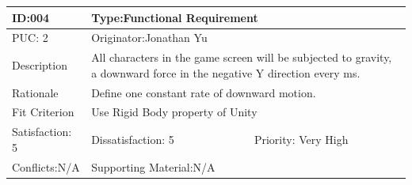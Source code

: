 \documentclass{article}
\begin{document}
	\begin{table}[H]
		\begin{tabular}{|l|l|l|}
			\hline
			ID:004 & \multicolumn{2}{l|}{Type:Functional Requirement} \\ \hline
			PUC: 2& \multicolumn{2}{l|}{Originator:Jonathan Yu} \\ \hline
			Description & \multicolumn{2}{m{0.85\textwidth}|}{All characters in the game screen will be subjected to gravity, a downward force in the negative Y direction every ms.} \\ \hline
			Rationale & \multicolumn{2}{m{0.85\textwidth}|}{Define one constant rate of downward motion.} \\ \hline
			Fit Criterion & \multicolumn{2}{m{0.85\textwidth}|}{Use Rigid Body property of Unity} \\ \hline
			Satisfaction: 5 & Dissatisfaction: 5 & Priority: Very High \\ \hline
			Conflicts:N/A & \multicolumn{2}{l|}{Supporting Material:N/A} \\ \hline
		\end{tabular}
	\end{table}
\end{document}

